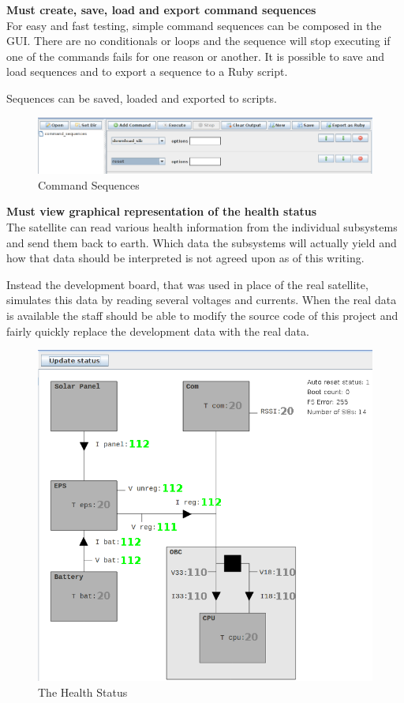 \textbf{Must create, save, load and export command sequences} \\
For easy and fast testing, simple command sequences can be composed in the GUI. There are no conditionals or loops and the sequence will stop executing if one of the commands fails for one reason or another. It is possible to save and load sequences and to export a sequence to a Ruby script.

Sequences can be saved, loaded and exported to scripts.

\begin{figure}[h!] \centering
	\includegraphics[scale=0.5]{img/fsgui_sequences}
  \caption{Command Sequences}
\end{figure}

\textbf{Must view graphical representation of the health status} \\
The satellite can read various health information from the individual subsystems and send them back to earth. Which data the subsystems will actually yield and how that data should be interpreted is not agreed upon as of this writing.

Instead the development board, that was used in place of the real satellite, simulates this data by reading several voltages and currents. When the real data is available the staff should be able to modify the source code of this project and fairly quickly replace the development data with the real data.

\begin{figure}[h!] \centering
	\includegraphics[scale=0.5]{img/fsgui_health}
  \caption{The Health Status}
\end{figure}

